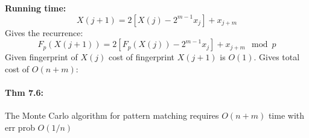 \documentclass[a4paper]{article}
\begin{document}
\textbf{Running time: }
$$
X(j+1)=2[X(j)-2^{m-1}x_j]+x_{j+m}
$$
Gives the recurrence:
$$
F_p(X(j+1))=2[F_p(X(j))-2^{m-1}x_j]+x_{j+m} \mod p
$$
Given fingerprint of $X(j)$ cost of fingerprint $X(j+1)$ is $O(1)$. Gives total cost of $O(n+m)$:
\paragraph{Thm 7.6:} The Monte Carlo algorithm for pattern matching requires $O(n+m)$ time with err prob $O(1/n)$
\end{document}
